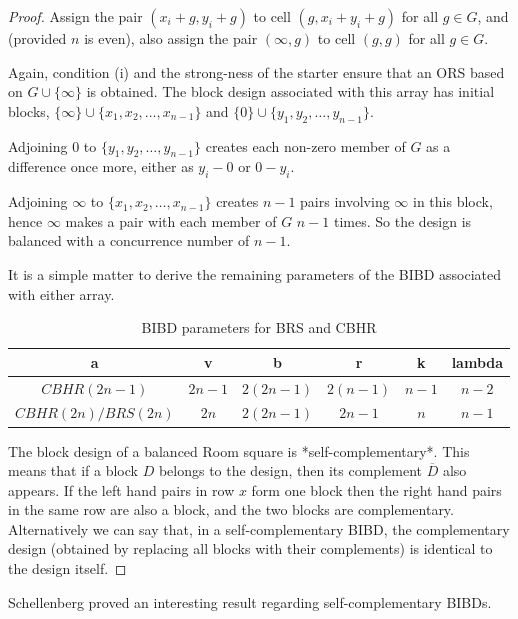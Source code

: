 \documentclass[
  11pt,
  a4paper]{book}
\begin{document}
\begin{proof}
Assign the pair $(x_i + g, y_i + g)$ to cell
$(g, x_i + y_i + g)$ for all $g \in G$, and (provided $n$ is
even), also assign the pair $(\infty, g)$ to cell $(g, g)$
for all $g \in G$.

Again, condition (i) and the strong-ness of the starter ensure that an
ORS based on $G \cup \{\infty\}$ is obtained. The block design
associated with this array has initial blocks,
$\{\infty\} \cup \{x_1, x_2, \ldots, x_{n - 1}\}$
and
$\{0\} \cup \{y_1, y_2, \ldots, y_{n - 1}\}$.

Adjoining 0 to $\{y_1, y_2, \ldots, y_{n - 1}\}$
creates each non-zero member of $G$ as a difference once
more, either as $y_i - 0$ or $0 - y_i$.

Adjoining $\infty$ to $\{x_1, x_2, \ldots, x_{n - 1}\}$
creates $n - 1$ pairs involving $\infty$ in this block,
hence $\infty$ makes a pair with each member of $G$ $n-1$
times. So the design is balanced with a concurrence number
of $n-1$.

It is a simple matter to derive the remaining parameters of the BIBD
associated with either array.

\begin{table}

\caption{\label{tab:unnamed-chunk-1}BIBD parameters for BRS and CBHR}
\centering
\begin{tabular}[t]{cccccc}
\toprule
a & v & b & r & k & lambda\\
\midrule
$CBHR(2n-1)$ & $2n - 1$ & $2(2n - 1)$ & $2(n - 1)$ & $n - 1$ & $n - 2$\\
$CBHR(2n)/BRS(2n)$ & $2n$ & $2(2n - 1)$ & $2n - 1$ & $n$ & $n - 1$\\
\bottomrule
\end{tabular}
\end{table}

The block design of a balanced Room square is *self-complementary*. This
means that if a block $D$ belongs to the design, then its complement
$\overline{D}$ also appears. If the left hand pairs in row $x$ form one
block then the right hand pairs in the same row are also a block, and
the two blocks are complementary. Alternatively we can say that, in a
self-complementary BIBD, the complementary design (obtained by replacing
all blocks with their complements) is identical to the design itself.
\end{proof}

Schellenberg proved an interesting result regarding
self-complementary BIBDs.
\end{document}
